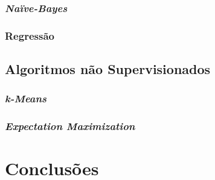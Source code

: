 \documentclass{article}
\begin{document}
\subsubsection{{\b \it Naïve-Bayes}}

\subsubsection{Regressão}

\subsection{Algoritmos não Supervisionados}

\subsubsection{{\b \it k-Means}}

\subsubsection{{\b \it Expectation Maximization}}

\section{Conclusões}


\end{document}

